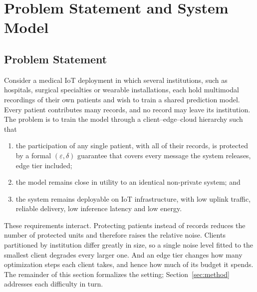 \section{Problem Statement and System Model}
\label{sec:model}

\subsection{Problem Statement}
Consider a medical IoT deployment in which several institutions, such as
hospitals, surgical specialties or wearable installations, each hold
multimodal recordings of their own patients and wish to train a shared
prediction model. Every patient contributes many records, and no record may
leave its institution. The problem is to train the model through a
client--edge--cloud hierarchy such that
\begin{enumerate}
\item the participation of any single patient, with all of their records, is
protected by a formal $(\varepsilon,\delta)$ guarantee that covers every
message the system releases, edge tier included;
\item the model remains close in utility to an identical non-private system;
and
\item the system remains deployable on IoT infrastructure, with low uplink
traffic, reliable delivery, low inference latency and low energy.
\end{enumerate}
These requirements interact. Protecting patients instead of records reduces
the number of protected units and therefore raises the relative noise.
Clients partitioned by institution differ greatly in size, so a single noise
level fitted to the smallest client degrades every larger one. And an edge
tier changes how many optimization steps each client takes, and hence how
much of its budget it spends. The remainder of this section formalizes the
setting; Section~\ref{sec:method} addresses each difficulty in turn.

